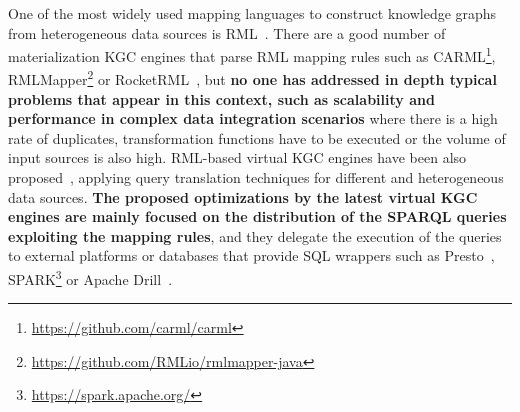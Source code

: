 One of the most widely used mapping languages to construct knowledge graphs from heterogeneous data sources is RML~\citep{dimou2014rml}. There are a good number of materialization KGC engines that parse RML mapping rules such as CARML\footnote{\url{https://github.com/carml/carml}}, RMLMapper\footnote{\url{https://github.com/RMLio/rmlmapper-java}} or RocketRML~\citep{csimcsek2019rocketrml}, but \textbf{no one has addressed in depth typical problems that appear in this context, such as scalability and performance in complex data integration scenarios} where there is a high rate of duplicates, transformation functions have to be executed or the volume of input sources is also high. RML-based virtual KGC engines have been also proposed~\citep{endris2019ontario,mami2019squerall}, applying query translation techniques for different and heterogeneous data sources. \textbf{The proposed optimizations by the latest virtual KGC engines are mainly focused on the distribution of the SPARQL queries exploiting the mapping rules}, and they delegate the execution of the queries to external platforms or databases that provide SQL wrappers such as Presto~\citep{bershad1988presto}, SPARK\footnote{\url{https://spark.apache.org/}} or Apache Drill~\citep{hausenblas2013apache}.

